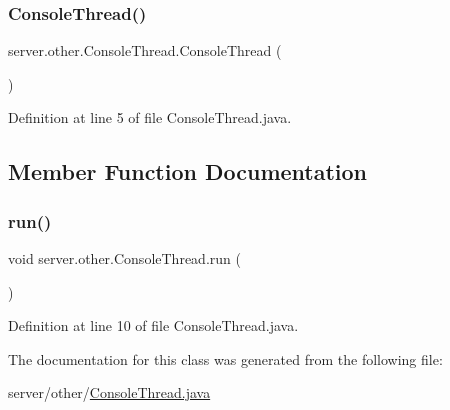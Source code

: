 \subsubsection{\texorpdfstring{Console\+Thread()}{ConsoleThread()}}
{\footnotesize\ttfamily server.\+other.\+Console\+Thread.\+Console\+Thread (\begin{DoxyParamCaption}{ }\end{DoxyParamCaption})}



Definition at line 5 of file Console\+Thread.\+java.



\subsection{Member Function Documentation}
\hypertarget{classserver_1_1other_1_1_console_thread_aa0b14ad43aa42913422a32fdbf08551a}{}\label{classserver_1_1other_1_1_console_thread_aa0b14ad43aa42913422a32fdbf08551a} 
\subsubsection{\texorpdfstring{run()}{run()}}
{\footnotesize\ttfamily void server.\+other.\+Console\+Thread.\+run (\begin{DoxyParamCaption}{ }\end{DoxyParamCaption})}



Definition at line 10 of file Console\+Thread.\+java.



The documentation for this class was generated from the following file\+:\begin{DoxyCompactItemize}
\item 
server/other/\hyperlink{_console_thread_8java}{Console\+Thread.\+java}\end{DoxyCompactItemize}
